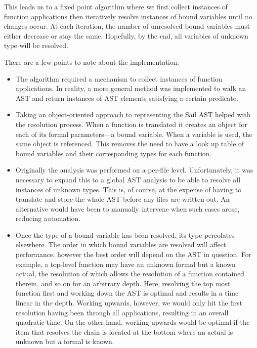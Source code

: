 \documentclass[a4paper,12pt,twoside,openright]{report}
\begin{document}
This leads us to a fixed point algorithm where we first collect instances of function applications then iteratively resolve instances of bound variables until no changes occur.   At each iteration, the number of unresolved bound variables must either decrease or stay the same.  Hopefully, by the end, all variables of unknown type will be resolved.

There are a few points to note about the implementation:

\begin{itemize}
  \item The algorithm required a mechanism to collect instances of function applications.  In reality, a more general method was implemented to walk an AST and return instances of AST elements satisfying a certain predicate.
  \item Taking an object-oriented approach to representing the Sail AST helped with the resolution process.  When a function is translated it creates an object for each of its formal parameters---a bound variable.  When a variable is used, the same object is referenced.  This removes the need to have a look up table of bound variables and their corresponding types for each function.
  \item Originally the analysis was performed on a per-file level.  Unfortunately, it was necessary to expand this to a global AST analysis to be able to resolve all instances of unknown types.  This is, of course, at the expense of having to translate and store the whole AST before any files are written out.  An alternative would have been to manually intervene when such cases arose, reducing automation.
  \item Once the type of a bound variable has been resolved, its type percolates elsewhere.  The order in which bound variables are resolved will affect performance, however the best order will depend on the AST in question.  For example, a top-level function may have an unknown formal but a known actual, the resolution of which allows the resolution of a function contained therein, and so on for an arbitrary depth.  Here, resolving the top most function first and working down the AST is optimal and results in a time linear in the depth.  Working upwards, however, we would only hit the first resolution having been through all applications, resulting in an overall quadratic time.  On the other hand, working upwards would be optimal if the item that resolves the chain is located at the bottom where an actual is unknown but a formal is known.
\end{itemize}
\end{document}
